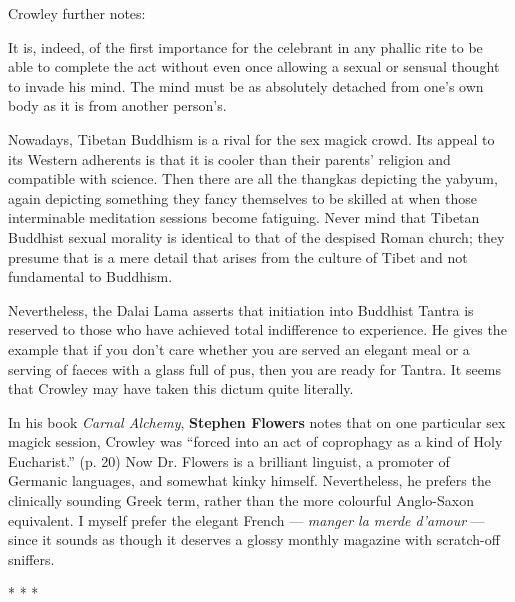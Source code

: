 Crowley further notes:

\begin{quotex}
It is, indeed, of the first importance for the celebrant in any phallic rite to be able to complete the act without even once allowing a sexual or sensual thought to invade his mind. The mind must be as absolutely detached from one's own body as it is from another person's.
\end{quotex}


Nowadays, Tibetan Buddhism is a rival for the sex magick crowd. Its appeal to its Western adherents is that it is cooler than their parents' religion and compatible with science. Then there are all the thangkas depicting the yabyum, again depicting something they fancy themselves to be skilled at when those interminable meditation sessions become fatiguing. Never mind that Tibetan Buddhist sexual morality is identical to that of the despised Roman church; they presume that is a mere detail that arises from the culture of Tibet and not fundamental to Buddhism.

Nevertheless, the Dalai Lama asserts that initiation into Buddhist Tantra is reserved to those who have achieved total indifference to experience. He gives the example that if you don't care whether you are served an elegant meal or a serving of faeces with a glass full of pus, then you are ready for Tantra. It seems that Crowley may have taken this dictum quite literally.

In his book \textit{Carnal Alchemy}, \textbf{Stephen Flowers} notes that on one particular sex magick session, Crowley was ``forced into an act of coprophagy as a kind of Holy Eucharist.'' (p. 20) Now Dr. Flowers is a brilliant linguist, a promoter of Germanic languages, and somewhat kinky himself. Nevertheless, he prefers the clinically sounding Greek term, rather than the more colourful Anglo-Saxon equivalent. I myself prefer the elegant French --- \emph{manger la merde d'amour} --- since it sounds as though it deserves a glossy monthly magazine with scratch-off sniffers.



\begin{center}* * *\end{center}

